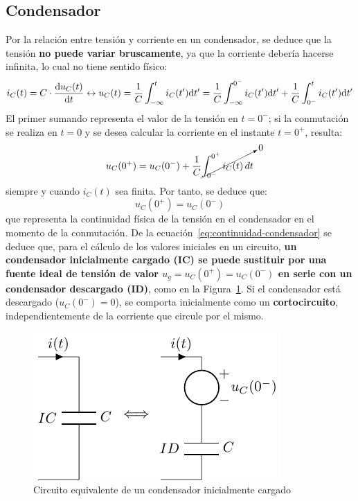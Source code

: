 \subsection{Condensador}
Por la relación entre tensión y corriente en un condensador, se deduce
que la tensión \textbf{no puede variar bruscamente}, ya que la
corriente debería hacerse infinita, lo cual no tiene sentido físico:
\begin{equation*}
  i_C(t) = C \cdot \diff{u_C(t)}{t}
  \leftrightarrow
  u_C(t) = \frac{1}{C} \int^t_{-\infty}i_C(t') \mathrm{d}t'= \frac{1}{C} \int^{0^-}_{-\infty}i_C(t')\mathrm{d}t' + \frac{1}{C} \int^{t}_{0^-}i_C(t')\mathrm{d}t'
\end{equation*}
El primer sumando representa el valor de la tensión en $t=0^-$; si la
conmutación se realiza en $t=0$ y se desea calcular la corriente en el
instante $t=0^+$, resulta:
\begin{equation*}
  u_C(0^+)=u_C(0^-)+ \dfrac{1}{C}\cancelto{0}{\int_{0^-}^{0^+} i_C(t)\, dt}
\end{equation*}
siempre y cuando $i_C(t)$ sea finita. Por tanto, se deduce que:
\begin{equation}\label{eq:continuidad-condensador}
  \boxed{u_C(0^+)=u_C(0^-)}
\end{equation}
que representa la continuidad física de la tensión en el condensador
en el momento de la conmutación. De la
ecuación~\eqref{eq:continuidad-condensador} se deduce que, para el
cálculo de los valores iniciales en un circuito, \textbf{un
  condensador inicialmente cargado (IC) se puede sustituir por una
  fuente ideal de tensión de valor $u_g=u_C(0^+)=u_C(0^-)$ en serie
  con un condensador descargado (ID)}, como en la
Figura~\ref{fig:condiciones_iniciales_C}. Si el condensador está
descargado ($u_C(0^-)=0$), se comporta inicialmente como un
\textbf{cortocircuito}, independientemente de la corriente que circule
por el mismo.
\begin{figure}[H]
  \centering \includegraphics{../figs/condiciones_iniciales_C.pdf}
  \caption{Circuito equivalente de un condensador inicialmente
    cargado}
  \label{fig:condiciones_iniciales_C}
\end{figure}
	
